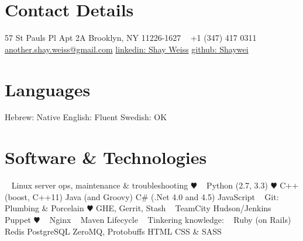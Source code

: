 \documentclass[]{friggeri-cv} %
\begin{document}


\begin{aside} %
\raggedright {\section{Contact Details}}
57 St Pauls Pl
Apt 2A
Brooklyn, NY
11226-1627
~
+1 (347) 417 0311
~
\href{mailto:another.shay.weiss@gmail.com}{another.shay.weiss@gmail.com}
\href{http://lnkd.in/eQjdHJ}{linkedin: Shay Weiss}
\href{https://github.com/Shaywei}{github: Shaywei}
\section{Languages}
Hebrew: Native
English: Fluent
Swedish: OK
\section{Software \& Technologies}
~
Linux server ops, maintenance \& troubleshooting {\color{red} $\varheartsuit$} 
~
Python (2.7, 3.3) {\color{red} $\varheartsuit$}
C++ (boost, C++11)
Java (and Groovy)
C\# (.Net 4.0 and 4.5)
JavaScript
~
Git: Plumbing \& Porcelain {\color{red} $\varheartsuit$}
GHE, Gerrit, Stash
~
TeamCity
Hudson/Jenkins
~
Puppet {\color{red} $\varheartsuit$}
~
Nginx
~
Maven Lifecycle
~
Tinkering knowledge:
~
Ruby (on Rails)
Redis
PostgreSQL
ZeroMQ,
Protobuffs
HTML
CSS \& SASS
\end{aside}

\end{document}
